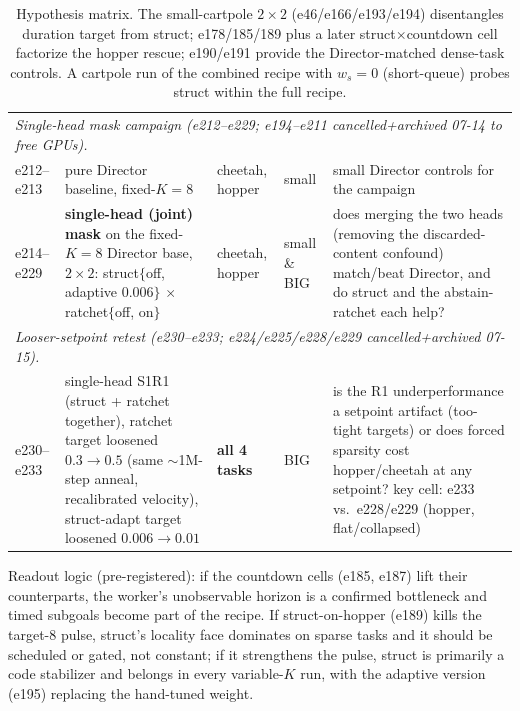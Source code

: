 \documentclass[10pt]{article}
\begin{document}
\begin{table}[h]
\begin{tabular}{lllll}
\midrule
\multicolumn{5}{l}{\emph{Single-head mask campaign (e212--e229; e194--e211 cancelled+archived 07-14 to free GPUs).}}\\
e212--e213 & pure Director baseline, fixed-$K{=}8$ & cheetah, hopper & small & small Director controls for the campaign \\
e214--e229 & \textbf{single-head (joint) mask} on the fixed-$K{=}8$ Director base, $2{\times}2$: struct$\{$off, adaptive 0.006$\}$ $\times$ ratchet$\{$off, on$\}$ & cheetah, hopper & small \& BIG & does merging the two heads (removing the discarded-content confound) match/beat Director, and do struct and the abstain-ratchet each help? \\
\midrule
\multicolumn{5}{l}{\emph{Looser-setpoint retest (e230--e233; e224/e225/e228/e229 cancelled+archived 07-15).}}\\
e230--e233 & single-head S1R1 (struct + ratchet together), ratchet target loosened $0.3{\to}0.5$ (same $\sim$1M-step anneal, recalibrated velocity), struct-adapt target loosened $0.006{\to}0.01$ & \textbf{all 4 tasks} & BIG & is the R1 underperformance a setpoint artifact (too-tight targets) or does forced sparsity cost hopper/cheetah at any setpoint? key cell: e233 vs.\ e228/e229 (hopper, flat/collapsed) \\
\bottomrule
\end{tabular}
\caption{Hypothesis matrix. The small-cartpole $2{\times}2$
(e46/e166/e193/e194) disentangles duration target from struct; e178/185/189
plus a later struct$\times$countdown cell factorize the hopper rescue; e190/e191
provide the Director-matched dense-task controls. A cartpole run of the
combined recipe with $w_s{=}0$ (short-queue) probes struct within the full
recipe.}
\label{tab:ongoing}
\end{table}

Readout logic (pre-registered): if the countdown cells (e185, e187) lift their
counterparts, the worker's unobservable horizon is a confirmed bottleneck and
timed subgoals become part of the recipe. If struct-on-hopper (e189) kills the
target-8 pulse, struct's locality face dominates on sparse tasks and it should
be scheduled or gated, not constant; if it strengthens the pulse, struct is
primarily a code stabilizer and belongs in every variable-$K$ run, with the
adaptive version (e195) replacing the hand-tuned weight.
\end{document}
